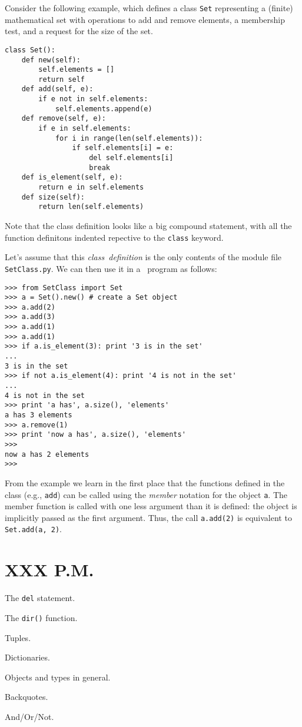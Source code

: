 Consider the following example, which defines a class {\tt Set}
representing a (finite) mathematical set with operations to add and
remove elements, a membership test, and a request for the size of the
set.
\begin{code}\begin{verbatim}
class Set():
    def new(self):
        self.elements = []
        return self
    def add(self, e):
        if e not in self.elements:
            self.elements.append(e)
    def remove(self, e):
        if e in self.elements:
            for i in range(len(self.elements)):
                if self.elements[i] = e:
                    del self.elements[i]
                    break
    def is_element(self, e):
        return e in self.elements
    def size(self):
        return len(self.elements)
\end{verbatim}\end{code}
Note that the class definition looks like a big compound statement,
with all the function definitons indented repective to the
{\tt class}
keyword.

Let's assume that this
{\it class\ definition}
is the only contents of the module file
{\tt SetClass.py}.
We can then use it in a \Python\ program as follows:
\begin{code}\begin{verbatim}
>>> from SetClass import Set
>>> a = Set().new() # create a Set object
>>> a.add(2)
>>> a.add(3)
>>> a.add(1)
>>> a.add(1)
>>> if a.is_element(3): print '3 is in the set'
... 
3 is in the set
>>> if not a.is_element(4): print '4 is not in the set'
... 
4 is not in the set
>>> print 'a has', a.size(), 'elements'
a has 3 elements
>>> a.remove(1)
>>> print 'now a has', a.size(), 'elements'
>>> 
now a has 2 elements
>>> 
\end{verbatim}\end{code}
From the example we learn in the first place that the functions defined
in the class (e.g.,
{\tt add})
can be called using the
{\it member}
notation for the object
{\tt a}.
The member function is called with one less argument than it is defined:
the object is implicitly passed as the first argument.
Thus, the call
{\tt a.add(2)}
is equivalent to
{\tt Set.add(a, 2)}.


\section{XXX P.M.}

The {\tt del} statement.

The {\tt dir()} function.

Tuples.

Dictionaries.

Objects and types in general.

Backquotes.

And/Or/Not.


